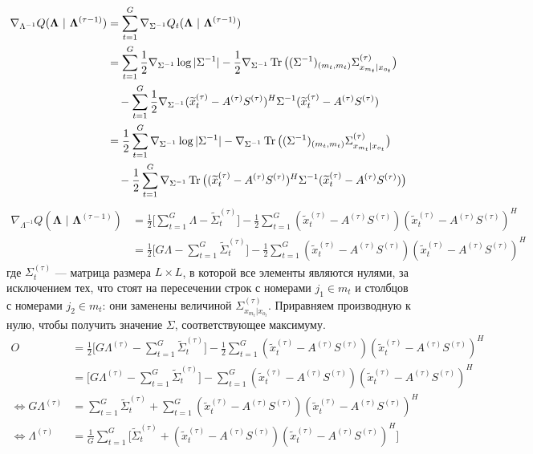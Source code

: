 \documentclass[11pt]{article}
\begin{document}
\begin{align*}
\nabla_{\Lambda^{-1}} Q(\mathbf{\Lambda} \text{ | } \mathbf{\Lambda}^{(\tau-1)}) &= \sum_{t = 1}^{G} \nabla_{\Sigma^{-1}} Q_t (\mathbf{\Lambda} \text{ | } \mathbf{\Lambda}^{(\tau-1)}) \\
&= \sum_{t = 1}^{G} \frac{1}{2} \nabla_{\Sigma^{-1}} \log |\Sigma^{-1}| - \frac{1}{2} \nabla_{\Sigma^{-1}} \Tr \big( (\Sigma^{-1})_{(m_t, m_t)} \Sigma^{(\tau)}_{x_{m_t}|x_{o_t}} \big) \\
&\hspace{10pt} - \sum_{t = 1}^{G} \frac{1}{2} \nabla_{\Sigma^{-1}}  (\widetilde{x}_t^{(\tau)}- A^{(\tau)}S^{(\tau)})^H \Sigma^{-1}  (\widetilde{x}_t^{(\tau)}- A^{(\tau)}S^{(\tau)}) \\
&= \frac{1}{2} \sum_{t = 1}^{G} \nabla_{\Sigma^{-1}} \log |\Sigma^{-1}| - \nabla_{\Sigma^{-1}} \Tr \big( (\Sigma^{-1})_{(m_t, m_t)} \Sigma^{(\tau)}_{x_{m_t}|x_{o_t}} \big) \\
&\hspace{10pt} - \frac{1}{2} \sum_{t = 1}^{G} \nabla_{\Sigma^{-1}} \Tr \big(  (\widetilde{x}_t^{(\tau)}- A^{(\tau)}S^{(\tau)})^H \Sigma^{-1}  (\widetilde{x}_t^{(\tau)}- A^{(\tau)}S^{(\tau)}) \big)
\end{align*}
\begin{align*}
\nabla_{\Lambda^{-1}} Q(\mathbf{\Lambda} \text{ | } \mathbf{\Lambda}^{(\tau-1)}) &= \frac{1}{2} \big[ \sum_{t = 1}^{G} \Lambda -  \widetilde{\Sigma}_{t}^{(\tau)} \big] - \frac{1}{2} \sum_{t = 1}^{G}  (\widetilde{x}_t^{(\tau)}- A^{(\tau)}S^{(\tau)}) (\widetilde{x}_t^{(\tau)}- A^{(\tau)}S^{(\tau)})^H \\
&= \frac{1}{2} \big[ G \Lambda - \sum_{t = 1}^{G} \widetilde{\Sigma}_{t}^{(\tau)} \big] - \frac{1}{2} \sum_{t = 1}^{G}  (\widetilde{x}_t^{(\tau)}- A^{(\tau)}S^{(\tau)}) (\widetilde{x}_t^{(\tau)}- A^{(\tau)}S^{(\tau)})^H
\end{align*}
где $\Sigma_{t}^{(\tau)}$ --- матрица размера $L \times L$, в которой все элементы являются нулями, за исключением тех, что стоят на пересечении строк с номерами $j_1 \in m_t$ и столбцов с номерами $j_2 \in m_t$: они заменены величиной $\Sigma^{(\tau)}_{x_{m_t}|x_{o_t}}$.
Приравняем производную к нулю, чтобы получить значение $\Sigma$, соответствующее максимуму.
\begin{align*}
O &= \frac{1}{2} \big[ G \Lambda^{(\tau)} - \sum_{t = 1}^{G} \widetilde{\Sigma}_{t}^{(\tau)} \big] - \frac{1}{2} \sum_{t = 1}^{G} (\widetilde{x}_t^{(\tau)}- A^{(\tau)}S^{(\tau)})(\widetilde{x}_t^{(\tau)}- A^{(\tau)}S^{(\tau)})^H \\
&= \big[ G \Lambda^{(\tau)} - \sum_{t = 1}^{G} \widetilde{\Sigma}_{t}^{(\tau)} \big] - \sum_{t = 1}^{G} (\widetilde{x}_t^{(\tau)}- A^{(\tau)}S^{(\tau)})(\widetilde{x}_t^{(\tau)}- A^{(\tau)}S^{(\tau)})^H \\
\iff G \Lambda^{(\tau)} &= \sum_{t = 1}^{G} \widetilde{\Sigma}_{t}^{(\tau)} + \sum_{t = 1}^{G}  (\widetilde{x}_t^{(\tau)}- A^{(\tau)}S^{(\tau)}) (\widetilde{x}_t^{(\tau)}- A^{(\tau)}S^{(\tau)})^H \\
\iff \Lambda^{(\tau)} &= \frac{1}{G} \sum_{t = 1}^{G} \Big[ \widetilde{\Sigma}_{t}^{(\tau)} +  (\widetilde{x}_t^{(\tau)}- A^{(\tau)}S^{(\tau)}) (\widetilde{x}_t^{(\tau)}- A^{(\tau)}S^{(\tau)})^H \Big]
\end{align*}
\end{document}
